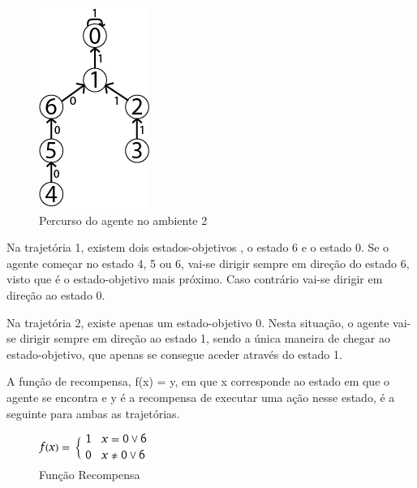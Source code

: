 \documentclass[11pt,twocolumn]{article}
\begin{document}
    \begin{figure}[htbp]
    \begin{center}
        \includegraphics[scale=0.5]{Trajetoria2.png}
        \caption{Percurso do agente no ambiente 2}
    \end{center}
    \end{figure}
    
    Na trajetória 1, existem dois estados-objetivos , o estado 6 e o estado 0. Se o agente começar no estado 4, 5 ou 6, vai-se dirigir
    sempre em direção do estado 6, visto que é o estado-objetivo mais próximo. Caso contrário vai-se dirigir em direção ao estado 0.\par \vspace{5mm}
    
    Na trajetória 2, existe apenas um estado-objetivo 0. Nesta situação, o agente vai-se dirigir sempre em direção ao estado 1,
    sendo a única maneira de chegar ao estado-objetivo, que apenas se consegue aceder através do estado 1.
    
    A função de recompensa, f(x) = y, em que x corresponde ao estado em que o agente se encontra e y é a recompensa de executar uma ação nesse estado,
    é a seguinte para ambas as trajetórias.\par
    
    \begin{figure}[htbp]
    \begin{center}
        \includegraphics[scale=0.8]{piece1.png}
        \caption{Função Recompensa}
    \end{center}
    \end{figure}
\end{document}
